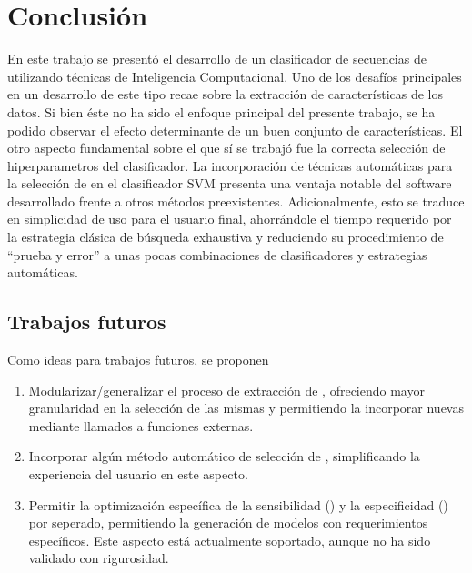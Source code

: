 %
%
%
%
\chapter{Conclusión}
%
En este trabajo se presentó el desarrollo de un clasificador de
secuencias de  utilizando técnicas de Inteligencia
Computacional.
Uno de los desafíos principales en un desarrollo de este tipo
recae sobre la extracción de características de los datos.
Si bien éste no ha sido el enfoque principal del presente trabajo, se
ha podido observar el efecto determinante de un buen conjunto de
características.
El otro aspecto fundamental sobre el que sí se trabajó fue la correcta
selección de hiperparametros del clasificador.
La incorporación de técnicas automáticas para la selección de
 en el clasificador SVM presenta una ventaja notable del
software desarrollado frente a otros métodos preexistentes.
Adicionalmente, esto se traduce en simplicidad de uso para el usuario
final, ahorrándole el tiempo requerido por la estrategia clásica de
búsqueda exhaustiva y reduciendo su procedimiento de ``prueba y
error'' a unas pocas combinaciones de clasificadores y estrategias
automáticas.
%
%
%
\section{Trabajos futuros}
%
Como ideas para trabajos futuros, se proponen
%
\begin{enumerate}
\item
  Modularizar/generalizar el proceso de extracción de ,
  ofreciendo mayor granularidad en la selección de las mismas y
  permitiendo la incorporar nuevas  mediante llamados a
  funciones externas.
\item
  Incorporar algún método automático de selección de ,
  simplificando la experiencia del usuario en este aspecto.
\item
  Permitir la optimización específica de la sensibilidad (\SE) y la
  especificidad (\SP) por seperado, permitiendo la generación de modelos
  con requerimientos específicos.
  Este aspecto está actualmente soportado, aunque no ha sido validado
  con rigurosidad.
\end{enumerate}
%
